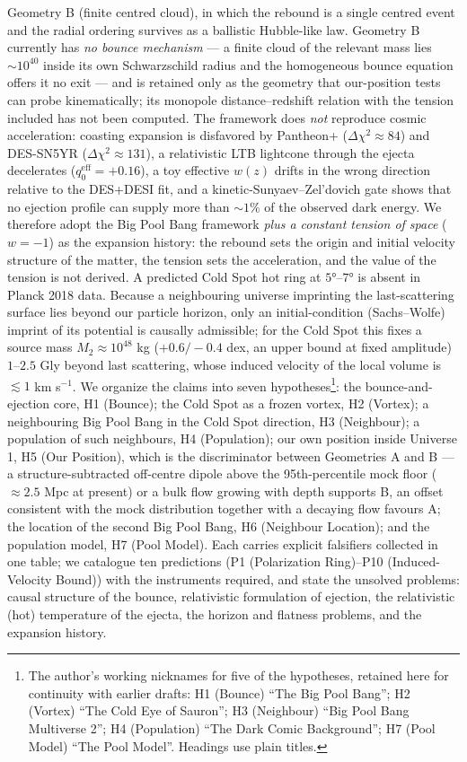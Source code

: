 \documentclass[
]{article}
\begin{document}
Geometry B (finite centred cloud), in which the rebound is a single
centred event and the radial ordering survives as a ballistic
Hubble-like law. Geometry B currently has \emph{no bounce mechanism} ---
a finite cloud of the relevant mass lies \(\sim\!10^{40}\) inside its
own Schwarzschild radius and the homogeneous bounce equation offers it
no exit --- and is retained only as the geometry that our-position tests
can probe kinematically; its monopole distance--redshift relation with
the tension included has not been computed. The framework does
\emph{not} reproduce cosmic acceleration: coasting expansion is
disfavored by Pantheon+ (\(\Delta\chi^2 \approx 84\)) and DES-SN5YR
(\(\Delta\chi^2 \approx 131\)), a relativistic LTB lightcone through the
ejecta decelerates (\(q_0^{\text{eff}} = +0.16\)), a toy effective
\(w(z)\) drifts in the wrong direction relative to the DES+DESI fit, and
a kinetic-Sunyaev--Zel'dovich gate shows that no ejection profile can
supply more than \(\sim\!1\%\) of the observed dark energy. We therefore
adopt the Big Pool Bang framework \emph{plus a constant tension of
space} (\(w=-1\)) as the expansion history: the rebound sets the origin
and initial velocity structure of the matter, the tension sets the
acceleration, and the value of the tension is not derived. A predicted
Cold Spot hot ring at \(5°\)--\(7°\) is absent in Planck 2018 data.
Because a neighbouring universe imprinting the last-scattering surface
lies beyond our particle horizon, only an initial-condition
(Sachs--Wolfe) imprint of its potential is causally admissible; for the
Cold Spot this fixes a source mass \(M_2 \approx 10^{48}\) kg
(\(+0.6/-0.4\) dex, an upper bound at fixed amplitude) \(1\)--\(2.5\)
Gly beyond last scattering, whose induced velocity of the local volume
is \(\lesssim 1\) km s\(^{-1}\). We organize the claims into seven
hypotheses\footnote{The author's working nicknames for five of the
  hypotheses, retained here for continuity with earlier drafts: H1
  (Bounce) ``The Big Pool Bang''; H2 (Vortex) ``The Cold Eye of
  Sauron''; H3 (Neighbour) ``Big Pool Bang Multiverse 2''; H4
  (Population) ``The Dark Comic Background''; H7 (Pool Model) ``The Pool
  Model''. Headings use plain titles.}: the bounce-and-ejection core, H1
(Bounce); the Cold Spot as a frozen vortex, H2 (Vortex); a neighbouring
Big Pool Bang in the Cold Spot direction, H3 (Neighbour); a population
of such neighbours, H4 (Population); our own position inside Universe 1,
H5 (Our Position), which is the discriminator between Geometries A and B
--- a structure-subtracted off-centre dipole above the 95th-percentile
mock floor (\(\approx 2.5\) Mpc at present) or a bulk flow growing with
depth supports B, an offset consistent with the mock distribution
together with a decaying flow favours A; the location of the second Big
Pool Bang, H6 (Neighbour Location); and the population model, H7 (Pool
Model). Each carries explicit falsifiers collected in one table; we
catalogue ten predictions (P1 (Polarization Ring)--P10 (Induced-Velocity
Bound)) with the instruments required, and state the unsolved problems:
causal structure of the bounce, relativistic formulation of ejection,
the relativistic (hot) temperature of the ejecta, the horizon and
flatness problems, and the expansion history.
\end{document}
